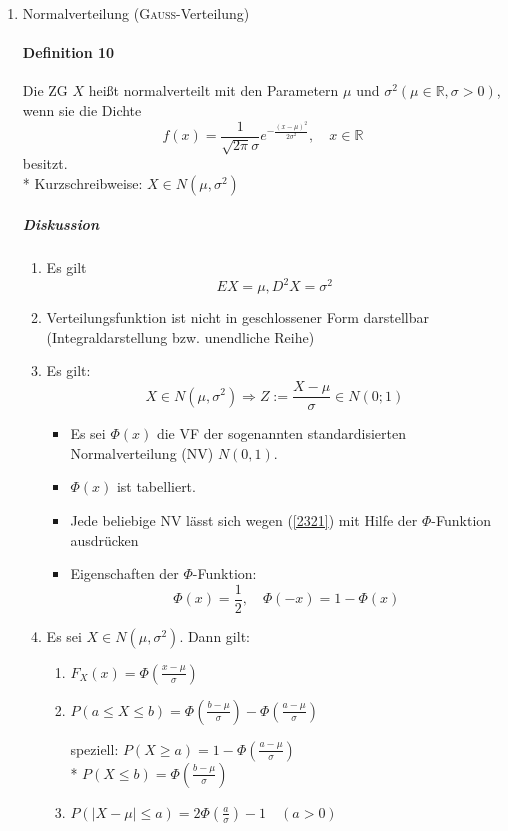 \documentclass[a4paper]{scrartcl}
\begin{document}
\begin{enumerate}
\item Normalverteilung (\textsc{Gauss}-Verteilung)
\paragraph{Definition 10} Die ZG $X$ heißt normalverteilt mit den Parametern $\mu$ und $\sigma^2 (\mu \in \mathbb{R}, \sigma > 0)$, wenn sie die Dichte \[f(x) = \frac{1}{\sqrt{2\pi} \sigma} e^{- \frac{(x-\mu)^2}{2 \sigma^2}}, \quad x \in \mathbb{R}\] besitzt.\\*
Kurzschreibweise: $X \in N (\mu,\sigma^2)$

\subparagraph{Diskussion}
    \begin{enumerate}
    \item Es gilt \[ EX = \mu ,D^2X = \sigma^2\]
    \item Verteilungsfunktion ist nicht in geschlossener Form darstellbar (Integraldarstellung bzw. unendliche Reihe)
    \item Es gilt: \begin{equation}\label{2321} X \in N(\mu,\sigma^2) \Rightarrow Z:= \frac{X-\mu}{\sigma} \in N (0;1)\end{equation}
    
    \begin{itemize}
    \item Es sei $\Phi (x)$ die VF der sogenannten standardisierten Normalverteilung (NV) $N(0,1)$.
    \item $\Phi (x)$ ist tabelliert.
    \item Jede beliebige NV lässt sich wegen (\ref{2321}) mit Hilfe der $\Phi$-Funktion ausdrücken
    \item Eigenschaften der $\Phi$-Funktion:
    \[ \Phi(x) = \frac{1}{2}, \quad \Phi(-x) = 1-  \Phi (x)\]
    
    \end{itemize}

\item Es sei $X \in N (\mu,\sigma^2)$. Dann gilt:
    \begin{enumerate}
    \item $F_X(x) = \Phi ( \frac{x-\mu}{\sigma})$
    \item $P(a \leq X \leq b) = \Phi ( \frac{b-\mu}{\sigma}) - \Phi ( \frac{a- \mu}{\sigma})$
    
    speziell: $P(X \geq a) = 1 - \Phi (\frac{a-\mu}{\sigma})$\\*
    $P(X \leq b) = \Phi (\frac{b - \mu}{\sigma})$
    \item $P(\lvert X - \mu \rvert \leq a) = 2 \Phi (\frac{a}{\sigma}) -1 \quad (a > 0)$
    

\end{enumerate}
\end{enumerate}
\end{enumerate}
\end{document}
